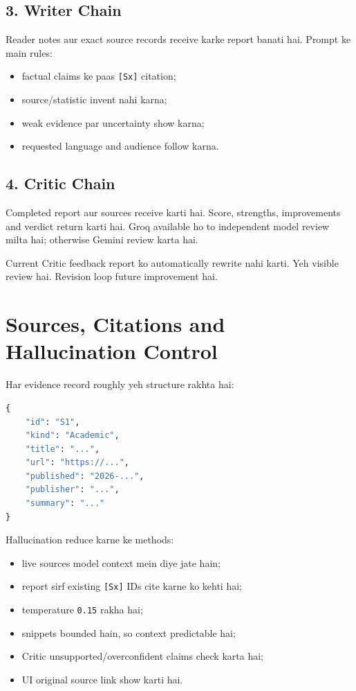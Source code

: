 \documentclass[11pt,a4paper]{article}
\newcommand{\code}[1]{\texttt{#1}}
\begin{document}
\subsection{3. Writer Chain}

Reader notes aur exact source records receive karke report banati hai. Prompt ke main rules:

\begin{itemize}
  \item factual claims ke paas \code{[Sx]} citation;
  \item source/statistic invent nahi karna;
  \item weak evidence par uncertainty show karna;
  \item requested language and audience follow karna.
\end{itemize}

\subsection{4. Critic Chain}

Completed report aur sources receive karti hai. Score, strengths, improvements and verdict return karti hai. Groq available ho to independent model review milta hai; otherwise Gemini review karta hai.

Current Critic feedback report ko automatically rewrite nahi karti. Yeh visible review hai. Revision loop future improvement hai.

\section{Sources, Citations and Hallucination Control}

Har evidence record roughly yeh structure rakhta hai:

\begin{lstlisting}[language=Python]
{
    "id": "S1",
    "kind": "Academic",
    "title": "...",
    "url": "https://...",
    "published": "2026-...",
    "publisher": "...",
    "summary": "..."
}
\end{lstlisting}

Hallucination reduce karne ke methods:

\begin{itemize}
  \item live sources model context mein diye jate hain;
  \item report sirf existing \code{[Sx]} IDs cite karne ko kehti hai;
  \item temperature \code{0.15} rakha hai;
  \item snippets bounded hain, so context predictable hai;
  \item Critic unsupported/overconfident claims check karta hai;
  \item UI original source link show karti hai.
\end{itemize}
\end{document}
